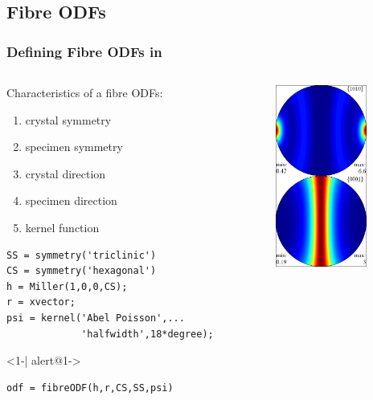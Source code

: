 \subsection*{Fibre ODFs}

\begin{frame}[fragile]
  \frametitle{Defining Fibre ODFs in \MTEX}

  \begin{columns}

    \begin{column}{8.5cm}

      Characteristics of a fibre ODFs:
      \begin{enumerate}
      \item crystal symmetry
      \item specimen symmetry
      \item crystal direction
      \item specimen direction
      \item kernel function
      \end{enumerate}


\begin{lstlisting}
SS = symmetry('triclinic')
CS = symmetry('hexagonal')
h = Miller(1,0,0,CS);
r = xvector;
psi = kernel('Abel Poisson',...
             'halfwidth',18*degree);
\end{lstlisting}

      \begin{actionenv}<1-| alert@1->
\begin{lstlisting}
odf = fibreODF(h,r,CS,SS,psi)
\end{lstlisting}
      \end{actionenv}

\end{column}

    \begin{column}{3cm}
      \includegraphics[width=3cm]{pic/fibreODF}
    \end{column}
  \end{columns}


\end{frame}


